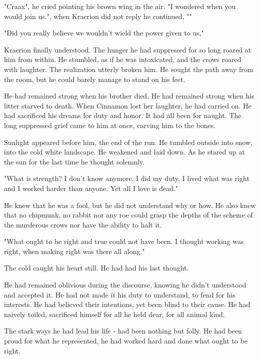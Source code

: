 \documentclass[smalldemyvopaper,11pt,twoside,onecolumn,openright,extrafontsizes]{memoir}
\begin{document}
"Craax", he cried pointing his brown wing in the air. "I wondered when you would join us.", when Kraerion did not reply he continued, ""


"Did you really believe we wouldn't wield the power given to us,"

Kraerion finally understood. The hunger he had suppressed for so long roared at him from within. He stumbled, as if he was intoxicated, and the crows roared with laughter. The realization utterly broken him. He sought the path away from the room, but he could barely manage to stand on his feet.

He had remained strong when his brother died. He had remained strong when his litter starved to death. When Cinnamon lost her laughter, he had carried on. He had sacrificed his dreams for duty and honor. It had all been for naught. The long suppressed grief came to him at once, carving him to the bones.

Sunlight appeared before him, the end of the run. He tumbled outside into snow, into the cold white landscape. He weakened and laid down. As he stared up at the sun for the last time he thought solemnly.

"What is strength? I don't know anymore. I did my duty, I lived what was right and I worked harder than anyone. Yet all I love is dead."

He knew that he was a fool, but he did not understand why or how. He also knew that no chipmunk, no rabbit nor any roe could grasp the depths of the scheme of the murderous crows nor have the ability to halt it.

"What ought to be right and true could not have been. I thought working was right, when making right was there all along."

The cold caught his heart still. He had had his last thought. 

He had remained oblivious during the discourse, knowing he didn't understood and accepted it. He had not made it his duty to understand, to fend for his interests. He had believed their intentions, yet been blind to their cause. He had naively toiled, sacrificed himself for all he held dear, for all animal kind.    

The stark ways he had lead his life - had been nothing but folly. He had been proud for what he represented, he had worked hard and done what ought to be right. 

\newpage

\vspace*{4.3cm}
\begin{localsize}{10}
	\begin{quote}
	\end{quote} 
\end{localsize}
\vspace{1cm}
\end{document}
